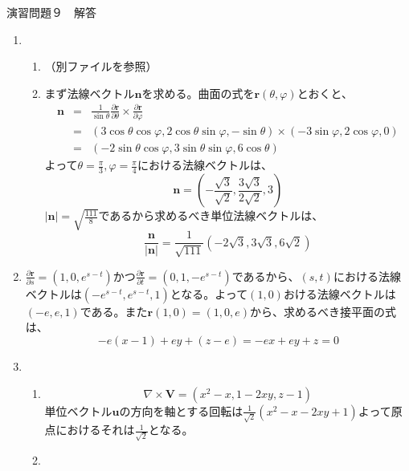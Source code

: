\documentclass{jarticle}
\begin{document}
\begin{center} {\Large 演習問題９　解答} \end{center}
  \begin{enumerate}
    \item
      \begin{enumerate}
        \item
          （別ファイルを参照）
        \item
          まず法線ベクトル${\bm n}$を求める。曲面の式を${\bm r}(\theta,\varphi)$とおくと、
          \begin{eqnarray*}
          {\bm n} & = & \frac{1}{\sin\theta}\frac{\partial {\bm r}}{\partial \theta} \times \frac{\partial \bm r}{\partial \varphi} \\ 
          & = & (3\cos\theta\cos\varphi,2\cos\theta\sin\varphi,-\sin\theta) \times (-3\sin\varphi,2\cos\varphi,0) \\
          & = & (-2\sin\theta\cos\varphi,3\sin\theta\sin\varphi,6\cos\theta)
          \end{eqnarray*}
          よって$\theta=\frac{\pi}{3},\varphi=\frac{\pi}{4}$における法線ベクトルは、
          \[ \bm n = (-\frac{\sqrt{3}}{\sqrt{2}},\frac{3\sqrt{3}}{2\sqrt{2}},3) \]
          $|\bm n| = \sqrt{\frac{111}{8}}$であるから求めるべき単位法線ベクトルは、
          \[ \frac{\bm n}{|\bm n|} = \frac{1}{\sqrt{111}} (-2\sqrt{3},3\sqrt{3},6\sqrt{2})\]
      \end{enumerate}
    \item
      $\frac{\partial \bm r}{\partial s} = (1,0,e^{s-t})$かつ$\frac{\partial \bm r}{\partial t} = (0,1,-e^{s-t})$であるから、$(s,t)$における法線ベクトルは$(-e^{s-t},e^{s-t},1)$となる。よって$(1,0)$おける法線ベクトルは$(-e,e,1)$である。また${\bm r}(1,0) = (1,0,e)$から、求めるべき接平面の式は、
      \[ -e(x-1)+ey+(z-e)=-ex+ey+z=0 \]
    \item
      \begin{enumerate}
        \item
          \[\nabla \times {\bm V} = (x^2-x,1-2xy,z-1)\]
          単位ベクトル$\bm u$の方向を軸とする回転は$\frac{1}{\sqrt 2}( x^2-x -2xy+1)$よって原点におけるそれは$\frac{1}{\sqrt{2}}$となる。
        \item

\end{enumerate}
\end{enumerate}
\end{document}
